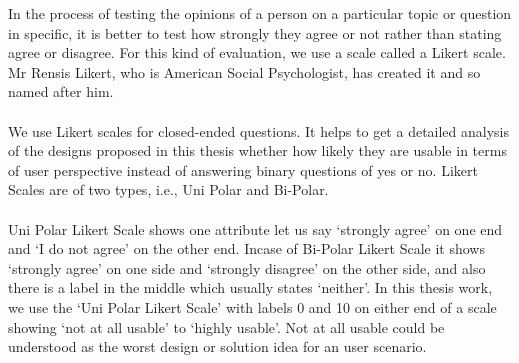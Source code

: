 In the process of testing the opinions of a person on a particular topic or question in specific, it is better to test how strongly they agree or not rather than stating agree or disagree. For this kind of evaluation, we use a scale called a Likert scale. \cite{likert} Mr Rensis Likert, who is American Social Psychologist, has created it and so named after him. \\ \\

We use Likert scales for closed-ended questions. It helps to get a detailed analysis of the designs proposed in this thesis whether how likely they are usable in terms of user perspective instead of answering binary questions of yes or no. Likert Scales are of two types, i.e., Uni Polar and Bi-Polar. \\ \\

Uni Polar Likert Scale shows one attribute let us say ‘strongly agree’ on one end and ‘I do not agree’ on the other end. Incase of Bi-Polar Likert Scale it shows ‘strongly agree’ on one side and ‘strongly disagree’ on the other side, and also there is a label in the middle which usually states ‘neither’. In this thesis work, we use the ‘Uni Polar Likert Scale’ with labels 0 and 10 on either end of a scale showing ‘not at all usable’ to ‘highly usable’. Not at all usable could be understood as the worst design or solution idea for an user scenario.\\ \\

\let\cleardoublepage\clearpage



